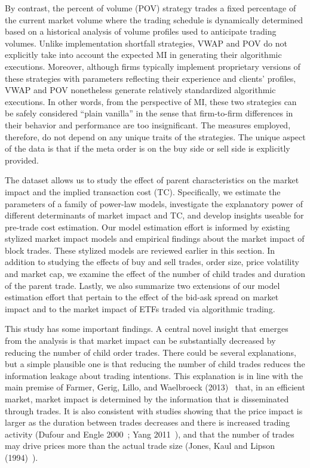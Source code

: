 By contrast, the percent of volume (POV) strategy trades a fixed percentage of the current market volume where the trading schedule is dynamically determined based on a historical analysis of volume profiles used to anticipate trading volumes. Unlike implementation shortfall strategies, VWAP and POV do not explicitly take into account the expected MI in generating their algorithmic executions. Moreover, although firms typically implement proprietary versions of these strategies with parameters reflecting their experience and clients' profiles, VWAP and POV nonetheless generate relatively standardized algorithmic executions. In other words, from the perspective of MI, these two strategies can be safely considered ``plain vanilla'' in the sense that firm-to-firm differences in their behavior and performance are too insignificant. The measures employed, therefore, do not depend on any unique traits of the strategies. The unique aspect of the data is that if the meta order is on the buy side or sell side is explicitly provided. 


The dataset allows us to study the effect of parent characteristics on the market impact and the implied transaction cost (TC). Specifically, we estimate the parameters of a family of power-law models, investigate the explanatory power of different determinants of market impact and TC, and develop insights useable for pre-trade cost estimation. Our model estimation effort is informed by existing stylized market impact models and empirical findings about the market impact of block trades. These stylized models are reviewed earlier in this section. In addition to studying the effects of buy and sell trades, order size, price volatility and market cap, we examine the effect of the number of child trades and duration of the parent trade. Lastly, we also summarize two extensions of our model estimation effort that pertain to the effect of the bid-ask spread on market impact and to the market impact of ETFs traded via algorithmic trading.


This study has some important findings. A central novel insight that emerges from the analysis is that market impact can be substantially decreased by reducing the number of child order trades. There could be several explanations, but a simple plausible one is that reducing the number of child trades reduces the information leakage about trading intentions. This explanation is in line with the main premise of Farmer, Gerig, Lillo, and Waelbroeck (2013)~\cite{farmer2012} that, in an efficient market, market impact is determined by the information that is disseminated through trades. It is also consistent with studies showing that the price impact is larger as the duration between trades decreases and there is increased trading activity (Dufour and Engle 2000~\cite{dufour}; Yang 2011~\cite{yang2011}), and that the number of trades may drive prices more than the actual trade size (Jones, Kaul and Lipson (1994)~\cite{jones1994}).


